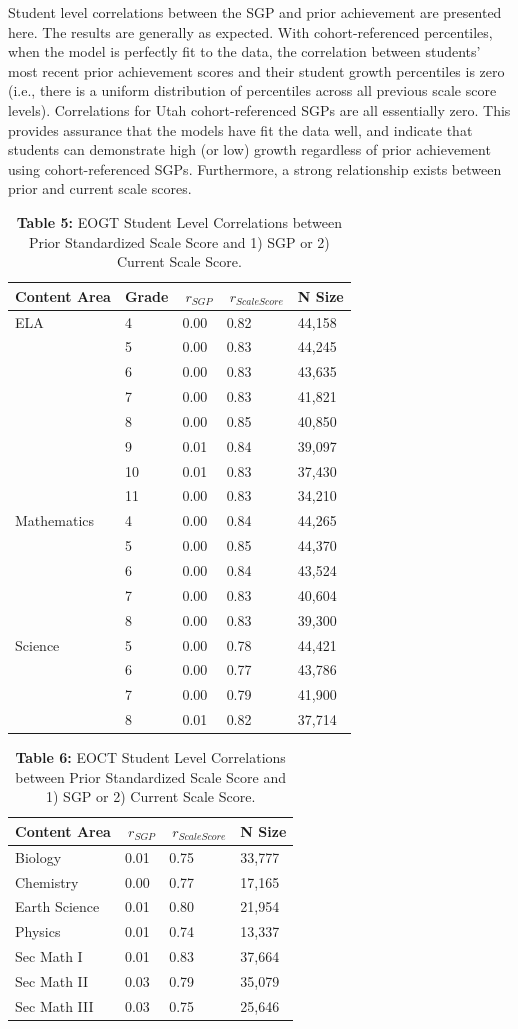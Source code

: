 \documentclass[12pt]{article}
\begin{document}
Student level correlations between the SGP and prior achievement are
presented here. The results are generally as expected. With
cohort-referenced percentiles, when the model is perfectly fit to the
data, the correlation between students' most recent prior achievement
scores and their student growth percentiles is zero (i.e., there is a
uniform distribution of percentiles across all previous scale score
levels). Correlations for Utah cohort-referenced SGPs are all
essentially zero. This provides assurance that the models have fit the
data well, and indicate that students can demonstrate high (or low)
growth regardless of prior achievement using cohort-referenced SGPs.
Furthermore, a strong relationship exists between prior and current
scale scores.

\begin{table}[H]
\caption*{\textbf{Table 5:} EOGT Student Level Correlations between Prior Standardized Scale Score and 1) SGP or 2) Current Scale Score.\label{table5}} 
\begin{center}
\begin{tabular}{lllll}
\hline\hline
\multicolumn{1}{c}{Content Area}&\multicolumn{1}{c}{Grade}&\multicolumn{1}{c}{$\
r_ {  SGP}$}&\multicolumn{1}{c}{$\
r_ { Scale Score}$}&\multicolumn{1}{c}{N Size}\tabularnewline
\hline
ELA& 4&0.00&0.82&44,158\tabularnewline
& 5&0.00&0.83&44,245\tabularnewline
& 6&0.00&0.83&43,635\tabularnewline
& 7&0.00&0.83&41,821\tabularnewline
& 8&0.00&0.85&40,850\tabularnewline
& 9&0.01&0.84&39,097\tabularnewline
&10&0.01&0.83&37,430\tabularnewline
&11&0.00&0.83&34,210\tabularnewline
Mathematics& 4&0.00&0.84&44,265\tabularnewline
& 5&0.00&0.85&44,370\tabularnewline
& 6&0.00&0.84&43,524\tabularnewline
& 7&0.00&0.83&40,604\tabularnewline
& 8&0.00&0.83&39,300\tabularnewline
Science& 5&0.00&0.78&44,421\tabularnewline
& 6&0.00&0.77&43,786\tabularnewline
& 7&0.00&0.79&41,900\tabularnewline
& 8&0.01&0.82&37,714\tabularnewline
\hline
\end{tabular}\end{center}

\end{table}

\begin{table}[H]
\caption*{\textbf{Table 6:} EOCT Student Level Correlations between Prior Standardized Scale Score and 1) SGP or 2) Current Scale Score.\label{table6}} 
\begin{center}
\begin{tabular}{llll}
\hline\hline
\multicolumn{1}{c}{Content Area}&\multicolumn{1}{c}{$\
r_ {  SGP}$}&\multicolumn{1}{c}{$\
r_ { Scale Score}$}&\multicolumn{1}{c}{N Size}\tabularnewline
\hline
Biology&0.01&0.75&33,777\tabularnewline
Chemistry&0.00&0.77&17,165\tabularnewline
Earth Science&0.01&0.80&21,954\tabularnewline
Physics&0.01&0.74&13,337\tabularnewline
Sec Math I&0.01&0.83&37,664\tabularnewline
Sec Math II&0.03&0.79&35,079\tabularnewline
Sec Math III&0.03&0.75&25,646\tabularnewline
\hline
\end{tabular}\end{center}

\end{table}
\end{document}
